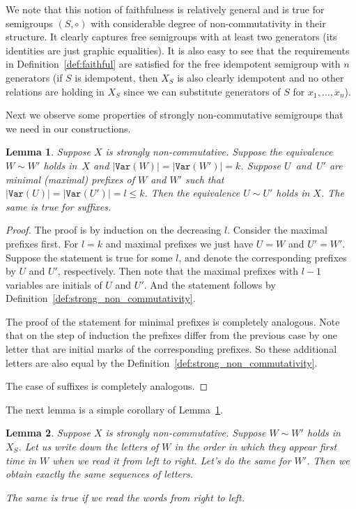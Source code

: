 \documentclass[11pt,letterpaper]{article}
\newtheorem{lemma}{Lemma}
\newcommand{\var}{\texttt{Var}}
\begin{document}
We note that this notion of faithfulness is relatively general and is true for
semigroups $(S,\circ)$ with considerable degree of non-commutativity in their
structure. It clearly captures free semigroups with at least two generators
(its identities are just graphic{} equalities). It is also easy to see that the
requirements in Definition~\ref{def:faithful} are satisfied for the free
idempotent semigroup with $n$ generators (if $S$ is idempotent, then $X_S$ is also
clearly idempotent and no other relations are holding in $X_S$ since we can
substitute generators of $S$ for $x_1, \ldots, x_n$).

Next we observe some properties of strongly non-commutative semigroups that we
need in our constructions.

\begin{lemma} \label{lem:prefix_equivalence}
Suppose $X$ is strongly non-commutative. Suppose the equivalence $W \sim W'$
holds in~$X$ and $|\var(W)|=|\var(W')|=k$. Suppose $U$~and~$U'$ are minimal
(maximal) prefixes of $W$ and $W'$ such that $|\var(U)| = |\var(U')| = l\leq k$.
Then the equivalence $U \sim U'$ holds in $X$. The same is true for suffixes.
\end{lemma}

\begin{proof}
The proof is by induction on the decreasing $l$. Consider the maximal prefixes
first. For $l=k$ and maximal prefixes we just have $U=W$ and $U'=W'$. Suppose
the statement is true for some $l$, and denote the corresponding prefixes by $U$
and $U'$, respectively. Then note that the maximal prefixes with $l-1$ variables
are initials of $U$ and $U'$. And the statement follows by
Definition~\ref{def:strong_non_commutativity}.

The proof of the statement for minimal prefixes is completely analogous. Note
that on the step of induction the prefixes differ from the previous case by one
letter that are initial marks of the corresponding prefixes. So these additional
letters are also equal by the Definition~\ref{def:strong_non_commutativity}.

The case of suffixes is completely analogous.
\end{proof}

The next lemma is a simple corollary of Lemma~\ref{lem:prefix_equivalence}.
\begin{lemma} \label{lem:variables_order}
Suppose $X$ is strongly non-commutative. Suppose $W \sim W'$ holds in $X_S$. Let us write down the letters of $W$ in the order in which they appear first time in $W$ when we read it from left to right. Let's do the same for $W'$. Then we obtain exactly the same sequences of letters.

The same is true if we read the words from right to left.
\end{lemma}
\end{document}

